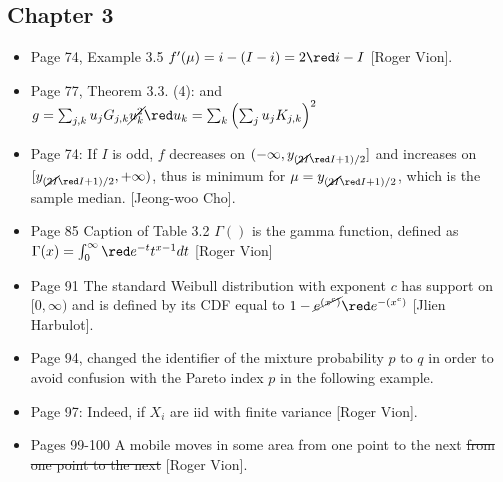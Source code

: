 \documentclass[11pt,twoside,onecolumn,a4paper]{article}
\newcommand{\cor}[2]{\cancel{#1} {\red #2}}
\begin{document}
 \subsection*{Chapter 3}
 \begin{itemize}
 \item Page 74, Example 3.5 $f'(\mu) = i - (I-i)= 2{\red i}-I$ [Roger Vion].
 \item Page 77, Theorem 3.3. (4): and $g=\sum_{j,k}u_jG_{j,k}\cor{u_k^2}{u_k}=\sum_k\lp\sum_j u_j K_{j,k}\rp^2$
 \item Page 74: If $I$ is odd, $f$
decreases on $(-\infty, y_{(\cor{2I}{I}+1)/2}]$ and increases on
$[y_{(\cor{2I}{I}+1)/2}, +\infty)$, thus is minimum for $\mu=
y_{(\cor{2I}{I}+1)/2}$, which is the sample median.  [Jeong-woo Cho].
\item Page 85 Caption of Table 3.2 $\Gamma()$ is
the gamma function, defined as $\Gamma(x)=\int_0^{\infty}{\red e^{-t} }
t^{x-1} dt$ [Roger Vion]
\item Page 91 The standard Weibull distribution with exponent $c$
has support on $[0,\infty ) $ and is defined by its CDF equal
to $1-\cor{e^{\lp  x ^c \rp}}{e^{-\lp  x ^c \rp}}$ [Jlien Harbulot].
\item Page 94, changed the identifier of the mixture probability $p$ to $q$ in order to avoid confusion with the Pareto index $p$ in the following example.
\item Page 97: Indeed, if $X_i$ are \cor{idd}{iid} with finite variance [Roger Vion].
 \item Pages 99-100 A mobile moves in some area
from one point to the next \sout{from one point to the next} [Roger Vion].
\end{itemize}
\end{document}
